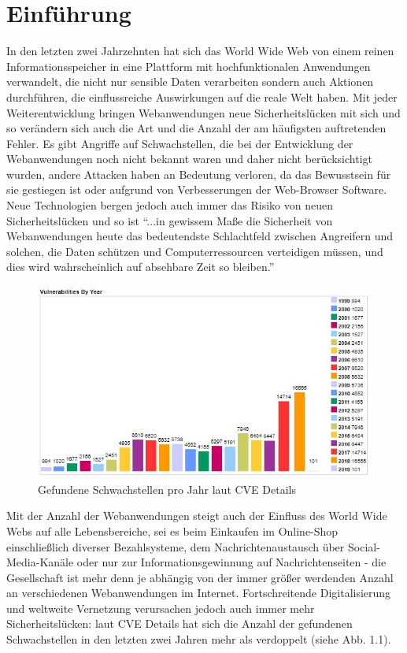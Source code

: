 \documentclass[12pt,oneside,a4paper,parskip]{scrbook}
\begin{document}
\mainmatter

\chapter{Einführung}\label{ch:intro}
In den letzten zwei Jahrzehnten hat sich das World Wide Web von einem reinen Informationsspeicher in eine Plattform mit hochfunktionalen Anwendungen verwandelt, die nicht nur sensible Daten verarbeiten sondern auch  Aktionen durchführen, die einflussreiche Auswirkungen auf die reale Welt haben.
Mit jeder Weiterentwicklung bringen Webanwendungen neue Sicherheitslücken mit sich und so verändern sich auch die Art und die Anzahl der am häufigsten auftretenden Fehler. Es gibt Angriffe auf Schwachstellen, die bei der Entwicklung der Webanwendungen noch nicht bekannt waren und daher nicht berücksichtigt wurden, andere Attacken haben an Bedeutung verloren, da das Bewusstsein für sie gestiegen ist oder aufgrund von Verbesserungen der Web-Browser Software. Neue Technologien bergen jedoch auch immer das Risiko von neuen Sicherheitslücken und so ist ``...in gewissem Maße die Sicherheit von Webanwendungen heute das bedeutendste Schlachtfeld zwischen Angreifern und solchen, die Daten schützen und Computerressourcen verteidigen müssen, und dies wird wahrscheinlich auf absehbare Zeit so bleiben.'' \cite{handbook}

\begin{figure}[htb!]
  \centering
    \includegraphics[width=1\textwidth]{Images/VulnByYear}
  \caption[Gefundene Schwachstellen pro Jahr laut CVE Details]{Gefundene Schwachstellen pro Jahr laut CVE Details \cite{cve}}
\end{figure}

Mit der Anzahl der Webanwendungen steigt auch der Einfluss des World Wide Webs auf alle Lebensbereiche, sei es beim Einkaufen im Online-Shop einschließlich diverser Bezahlsysteme, dem Nachrichtenaustausch über Social-Media-Kanäle oder nur zur Informationsgewinnung auf Nachrichtenseiten - die Gesellschaft ist mehr denn je abhängig von der immer größer werdenden Anzahl an verschiedenen Webanwendungen im Internet.
Fortschreitende Digitalisierung und weltweite Vernetzung verursachen jedoch auch immer mehr Sicherheitslücken: laut CVE Details hat sich die Anzahl der gefundenen Schwachstellen in den letzten zwei Jahren mehr als verdoppelt (siehe Abb. 1.1).
\end{document}
